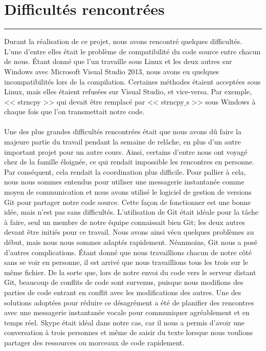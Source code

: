 \documentclass[10pt,letterpaper]{article}
\begin{document}
\section{Difficultés rencontrées}
\hrule
\vspace{1em}
Durant la réalisation de ce projet, nous avons rencontré quelques difficultés. 
L’une d’entre elles était le problème de compatibilité du code source entre chacun de nous. 
Étant donné que l’un travaille sous Linux et les deux autres sur Windows avec Microsoft Visual Studio 2013, 
nous avons eu quelques incompatibilités lors de la compilation. 
Certaines méthodes étaient acceptées sous Linux, mais elles étaient refusées sur Visual Studio, et vice-versa. 
Par exemple, << strncpy >> qui devait être remplacé par << strncpy$\_$s >> sous Windows à chaque fois que l’on transmettait notre code.\\
\\
Une des plus grandes difficultés rencontrées était que nous avons dû faire la majeure partie du travail pendant la semaine de relâche, 
en plus d'un autre important projet pour un autre cours. 
Ainsi, certains d’entre nous ont voyagé chez de la famille éloignée, ce qui rendait impossible les rencontres en personne. 
Par conséquent, cela rendait la coordination plus difficile. 
Pour pallier à cela, nous nous sommes entendus pour utiliser une messagerie instantanée comme moyen de communication 
et nous avons utilisé le logiciel de gestion de versions Git pour partager notre code source. 
Cette façon de fonctionner est une bonne idée, mais n’est pas sans difficultés. 
L’utilisation de Git était idéale pour la tâche à faire, seul un membre de notre équipe connaissait bien Git; les deux autres devant être initiés pour ce travail. 
Nous avons ainsi vécu quelques problèmes au début, mais nous nous sommes adaptés rapidement. 
Néanmoins, Git nous a posé d’autres complications. 
Étant donné que nous travaillions chacun de notre côté sans se voir en personne, il est arrivé que nous travaillions tous les trois sur le même fichier. 
De la sorte que, lors de notre envoi du code vers le serveur distant Git, beaucoup de conflits de code sont survenus, 
puisque nous modifions des parties de code entrant en conflit avec les modifications des autres. 
Une des solutions adoptées pour réduire ce désagrément a été de planifier des rencontres avec une 
messagerie instantanée vocale pour communiquer agréablement et en temps réel. 
Skype était idéal dans notre cas, car il nous a permis d’avoir une conversation à trois personnes et même de 
saisir du texte lorsque nous voulions partager des ressources ou morceaux de code rapidement.\\
\end{document}

